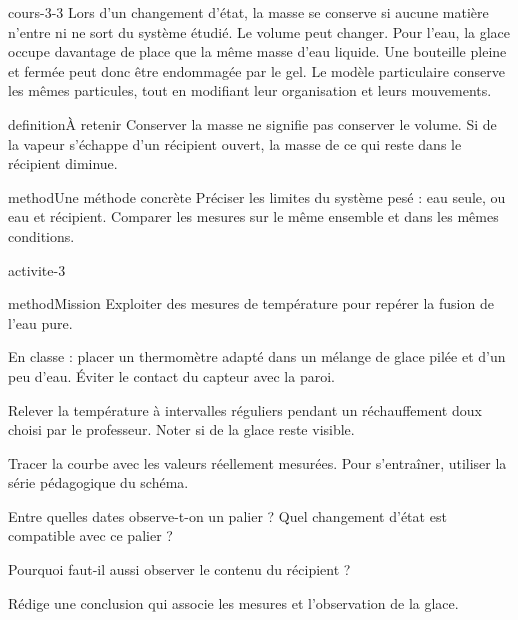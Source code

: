 \documentclass[12pt,twoside,openany]{book}
\begin{document}
\label{ch-3-cours-3}
\begin{pcFiche}{cours-3-3}
Lors d’un changement d’état, la masse se conserve si aucune matière n’entre ni ne sort du système étudié. Le volume peut changer. Pour l’eau, la glace occupe davantage de place que la même masse d’eau liquide. Une bouteille pleine et fermée peut donc être endommagée par le gel. Le modèle particulaire conserve les mêmes particules, tout en modifiant leur organisation et leurs mouvements.\par
{}
\begin{pcEncadre}{definition}{À retenir}
Conserver la masse ne signifie pas conserver le volume. Si de la vapeur s’échappe d’un récipient ouvert, la masse de ce qui reste dans le récipient diminue.\par
\end{pcEncadre}
\begin{pcEncadre}{method}{Une méthode concrète}
Préciser les limites du système pesé : eau seule, ou eau et récipient. Comparer les mesures sur le même ensemble et dans les mêmes conditions.\par
\end{pcEncadre}
\end{pcFiche}
\label{ch-3-activite}
\begin{pcFiche}{activite-3}
\begin{pcEncadre}{method}{Mission}
Exploiter des mesures de température pour repérer la fusion de l’eau pure.\par
\end{pcEncadre}
\begin{questions}
\item En classe : placer un thermomètre adapté dans un mélange de glace pilée et d’un peu d’eau. Éviter le contact du capteur avec la paroi.
\item Relever la température à intervalles réguliers pendant un réchauffement doux choisi par le professeur. Noter si de la glace reste visible.
\item Tracer la courbe avec les valeurs réellement mesurées. Pour s’entraîner, utiliser la série pédagogique du schéma.
\end{questions}
\begin{questions}
\item Entre quelles dates observe-t-on un palier ? Quel changement d’état est compatible avec ce palier ?
\item Pourquoi faut-il aussi observer le contenu du récipient ?
\item Rédige une conclusion qui associe les mesures et l’observation de la glace.
\end{questions}
\end{pcFiche}
\end{document}

